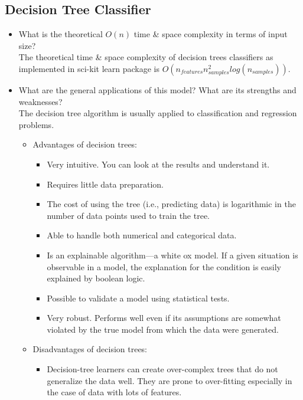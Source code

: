 \documentclass[12pt]{article}
\begin{document}
\subsection*{Decision Tree Classifier}
\begin{itemize} [noitemsep,nolistsep]
\item What is the theoretical $O(n)$ time \& space complexity in terms of input size?\\ 
The theoretical time \& space complexity of decision trees classifiers as implemented in sci-kit learn package is $O(n_{features} n^2_{samples} log(n_{samples}))$.
\item What are the general applications of this model? What are its strengths and weaknesses?\\ 
The decision tree algorithm is usually applied to classification and regression problems. 
       \begin{itemize}[noitemsep,nolistsep]
       \item Advantages of decision trees:
              \begin{itemize}[noitemsep,nolistsep]
                     \item Very intuitive. You can look at the results and understand it. 
                     \item Requires little data preparation. 
                     \item The cost of using the tree (i.e., predicting data) is logarithmic in the number of data points used to train the tree.
                     \item Able to handle both numerical and categorical data.
                     \item Is an explainable algorithm---a white ox model. If a given situation is observable in a model, the explanation for the condition is easily explained by boolean logic.
                     \item Possible to validate a model using statistical tests. 
                     \item Very robust. Performs well even if its assumptions are somewhat violated by the true model from which the data were generated.
              \end{itemize}
       \item Disadvantages of decision trees:
              \begin{itemize}[noitemsep,nolistsep]
                     \item Decision-tree learners can create over-complex trees that do not generalize the data well. They are prone to over-fitting especially in the case of data with lots of features.

\end{itemize}
\end{itemize}
\end{itemize}
\end{document}

